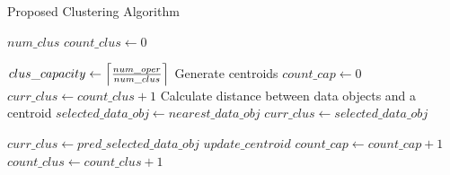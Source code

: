 \documentclass[runningheads]{llncs}
\DeclarePairedDelimiter\ceil{\lceil}{\rceil}
\begin{document}
\begin{algorithm}
\caption{Proposed Clustering Algorithm}\label{alg2}
\begin{algorithmic}
\Require $num\_clus$
\State $count\_clus \gets 0$

\State $clus\_capacity \gets \ceil*{\frac{num\_oper}{num\_clus}}$
\State Generate centroids
    \State $count\_cap \gets 0$
    \State $curr\_clus \gets count\_clus + 1$
          \State Calculate distance between data objects and a centroid   
          \State $selected\_data\_obj \gets nearest\_data\_obj$
          \State $curr\_clus \gets selected\_data\_obj$    

               
              \State $curr\_clus \gets pred\_selected\_data\_obj$
          \EndIf
          \State $update\_centroid$
          \State $count\_cap \gets count\_cap + 1 $
	\EndWhile
    \State $count\_clus \gets count\_clus + 1 $
\EndWhile
\end{algorithmic}
\end{algorithm}

\end{document}
